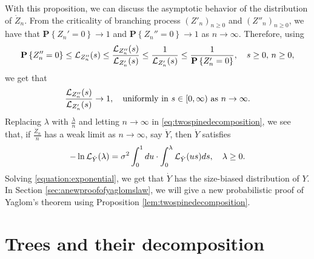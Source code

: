 \documentclass[12pt]{amsart}
\numberwithin{equation}{section}
\newcommand{\prob}{\mathbf P}
\newcommand{\set}[1]{\left\{ #1 \right\}}
\newcommand{\uniformly}{\text{uniformly in }}
\begin{document}
\par
	With this proposition, we can discuss the asymptotic behavior of the distribution of $\dot Z_n$. 
	From the criticality of branching process $(Z'_n)_{n\ge 0}$ and $(Z''_n)_{n\ge 0}$, we have that $\prob\set{Z_n'=0}\to 1$ and $\prob\set{Z_n''=0}\to 1$ as $n\to\infty$. 
	Therefore, using
\begin{equation*}
		\prob\set{Z_n''=0}
	\leq
		\cL_{Z_n''}(s)
	\leq
		\frac{\cL_{Z_n''}(s)}{\cL_{Z_n'}(s)}
	\leq
		\frac{1}{\cL_{Z_n'}(s)}
	\leq
		\frac{1}{\prob \set{Z_n'=0}},
	\quad 
		s\geq 0,\, n\ge 0,
\end{equation*}
	we get that
\begin{equation}
\label{eq:uniformly}
	    \frac{\cL_{Z_n''}(s)}{\cL_{Z_n'}(s)}
	\to
	    1,
	\quad 
		\uniformly s\in [0,\infty)\text{ as } n\to\infty.
\end{equation}
	Replacing $\lambda$ with $\frac{\lambda}{n}$ and letting $n\to\infty$ in \eqref{eq:twospinedecomposition}, 
    we see that, if $\frac{\dot Z_n}{n}$ has a weak limit as $n\to\infty$, say $\dot Y$, then $\dot Y$ satisfies
\begin{equation}
\label{equation:exponential}
		-\ln \mathcal L_{\dot Y}(\lambda)
	=
		\sigma^2\int_0^1du\cdot\int_0^\lambda \mathcal L_{\dot Y}(us)ds
		,
	\quad
		\lambda \geq 0.
\end{equation}
	Solving \eqref{equation:exponential}, we get that $\dot Y$ has the size-biased distribution of $Y$. 
	In Section \ref{sec:anewproofofyaglomslaw}, we will give a new probabilistic proof of Yaglom's theorem using Proposition \ref{lem:twospinedecomposition}.
\section{Trees and their decomposition}
\label{sec:preliminary}
\end{document}
